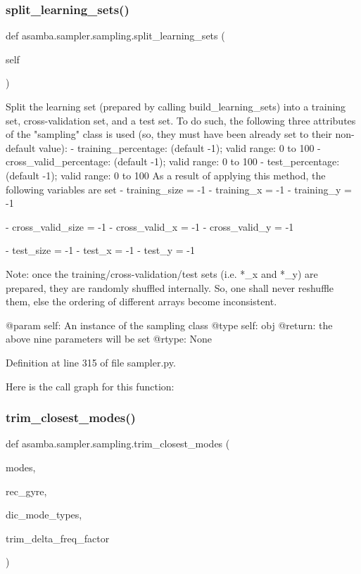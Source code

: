 \subsubsection{\texorpdfstring{split\+\_\+learning\+\_\+sets()}{split\_learning\_sets()}}
{\footnotesize\ttfamily def asamba.\+sampler.\+sampling.\+split\+\_\+learning\+\_\+sets (\begin{DoxyParamCaption}\item[{}]{self }\end{DoxyParamCaption})}

\begin{DoxyVerb}Split the learning set (prepared by calling build_learning_sets) into a training set, cross-validation
set, and a test set. To do such, the following three attributes of the "sampling" class is used (so, they
must have been already set to their non-default value):
  - training_percentage: (default -1); valid range: 0 to 100
  - cross_valid_percentage: (default -1); valid range: 0 to 100
  - test_percentage: (default -1); valid range: 0 to 100
As a result of applying this method, the following variables are set
  - training_size = -1
  - training_x = -1
  - training_y = -1

  - cross_valid_size = -1
  - cross_valid_x = -1
  - cross_valid_y = -1

  - test_size = -1
  - test_x = -1
  - test_y = -1

Note: once the training/cross-validation/test sets (i.e. *_x and *_y) are prepared, they are randomly
  shuffled internally. So, one shall never reshuffle them, else the ordering of different arrays 
  become inconsistent.

@param self: An instance of the sampling class
@type self: obj
@return: the above nine parameters will be set
@rtype: None
\end{DoxyVerb}
 

Definition at line 315 of file sampler.\+py.

Here is the call graph for this function\+:
\mbox{\label{classasamba_1_1sampler_1_1sampling_a75e186291813796d1114ccf2e1f3b2c3}} 
\subsubsection{\texorpdfstring{trim\+\_\+closest\+\_\+modes()}{trim\_closest\_modes()}}
{\footnotesize\ttfamily def asamba.\+sampler.\+sampling.\+trim\+\_\+closest\+\_\+modes (\begin{DoxyParamCaption}\item[{}]{modes,  }\item[{}]{rec\+\_\+gyre,  }\item[{}]{dic\+\_\+mode\+\_\+types,  }\item[{}]{trim\+\_\+delta\+\_\+freq\+\_\+factor }\end{DoxyParamCaption})}



